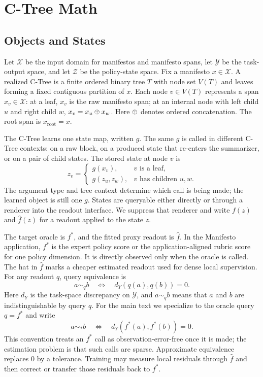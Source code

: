 \section{C-Tree Math}\label{sec:v8-ctree-math}

\subsection{Objects and States}

Let \(\mathcal X\) be the input domain for manifestos and manifesto spans, let
\(\mathcal Y\) be the task-output space, and let \(\mathcal Z\) be the
policy-state space. Fix a manifesto \(x\in\mathcal X\). A realized C-Tree is a
finite ordered binary tree \(T\) with node set \(V(T)\) and leaves forming a
fixed contiguous partition of \(x\). Each node \(v\in V(T)\) represents a span
\(x_v\in\mathcal X\): at a leaf, \(x_v\) is the raw manifesto span; at an
internal node with left child \(u\) and right child \(w\),
\(x_v=x_u\oplus x_w\). Here \(\oplus\) denotes ordered concatenation. The
root span is \(x_{\mathrm{root}}=x\).

The C-Tree learns one state map, written \(g\). The same \(g\) is called in
different C-Tree contexts: on a raw block, on a produced state that re-enters
the summarizer, or on a pair of child states. The stored state at node \(v\)
is
\[
  z_v =
  \begin{cases}
    g(x_v), & v \text{ is a leaf},\\
    g(z_u,z_w), & v \text{ has children }u,w.
  \end{cases}
\]
The argument type and tree context determine which call is being made; the
learned object is still one \(g\).
States are queryable either directly or through a renderer into the readout
interface. We suppress that renderer and write \(f(z)\) and \(\widehat f(z)\)
for a readout applied to the state \(z\).

The target oracle is \(f^\ast\), and the fitted proxy readout is
\(\widehat f\). In the Manifesto application, \(f^\ast\) is the expert policy
score or the application-aligned rubric score for one policy dimension. It is
directly observed only when the oracle is called. The hat in \(\widehat f\)
marks a cheaper estimated readout used for dense local supervision. For any
readout \(q\), query equivalence is
\[
  a\sim_q b
  \quad\Longleftrightarrow\quad
  d_Y(q(a),q(b))=0 .
\]
Here \(d_Y\) is the task-space discrepancy on \(\mathcal Y\), and
\(a\sim_q b\) means that \(a\) and \(b\) are indistinguishable by query \(q\).
For the main text we specialize to the oracle query \(q=f^\ast\) and write
\[
  a\sim_\ast b
  \quad\Longleftrightarrow\quad
  d_Y(f^\ast(a),f^\ast(b))=0 .
\]
This convention treats an \(f^\ast\) call as observation-error-free once it is
made; the estimation problem is that such calls are sparse. Approximate
equivalence replaces \(0\) by a tolerance. Training may measure local residuals
through \(\widehat f\) and then correct or transfer those residuals back to
\(f^\ast\).

